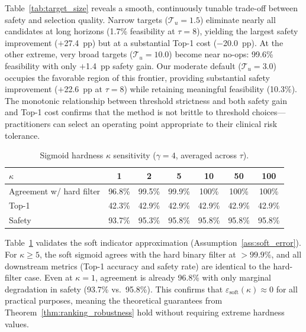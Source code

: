 \documentclass{article}
\newcommand{\cT}{\mathcal{T}}
\begin{document}
Table~\ref{tab:target_size} reveals a smooth, continuously tunable trade-off between safety and selection quality. Narrow targets ($\cT_u = 1.5$) eliminate nearly all candidates at long horizons (1.7\% feasibility at $\tau = 8$), yielding the largest safety improvement ($+$27.4~pp) but at a substantial Top-1 cost ($-$20.0~pp). At the other extreme, very broad targets ($\cT_u = 10.0$) become near no-ops: 99.6\% feasibility with only $+$1.4~pp safety gain. Our moderate default ($\cT_u = 3.0$) occupies the favorable region of this frontier, providing substantial safety improvement ($+$22.6~pp at $\tau = 8$) while retaining meaningful feasibility (10.3\%). The monotonic relationship between threshold strictness and both safety gain and Top-1 cost confirms that the method is not brittle to threshold choices---practitioners can select an operating point appropriate to their clinical risk tolerance.

\begin{table}[h]
\centering
\caption{Sigmoid hardness $\kappa$ sensitivity ($\gamma = 4$, averaged across $\tau$).}
\label{tab:kappa}
\small
\begin{tabular}{l c c c c c c}
\toprule
$\kappa$ & 1 & 2 & 5 & 10 & 50 & 100 \\
\midrule
Agreement w/ hard filter & 96.8\% & 99.5\% & 99.9\% & 100\% & 100\% & 100\% \\
Top-1 & 42.3\% & 42.9\% & 42.9\% & 42.9\% & 42.9\% & 42.9\% \\
Safety & 93.7\% & 95.3\% & 95.8\% & 95.8\% & 95.8\% & 95.8\% \\
\bottomrule
\end{tabular}
\end{table}

Table~\ref{tab:kappa} validates the soft indicator approximation (Assumption~\ref{ass:soft_error}). For $\kappa \geq 5$, the soft sigmoid agrees with the hard binary filter at $> 99.9\%$, and all downstream metrics (Top-1 accuracy and safety rate) are identical to the hard-filter case. Even at $\kappa = 1$, agreement is already 96.8\% with only marginal degradation in safety (93.7\% vs.\ 95.8\%). This confirms that $\varepsilon_{\text{soft}}(\kappa) \approx 0$ for all practical purposes, meaning the theoretical guarantees from Theorem~\ref{thm:ranking_robustness} hold without requiring extreme hardness values.
\end{document}
